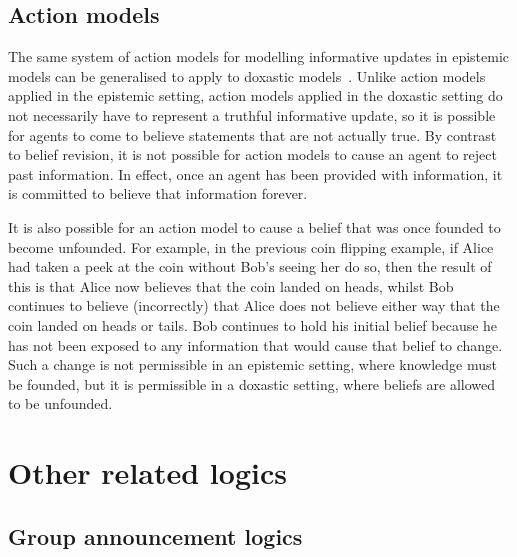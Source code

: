 \subsection{Action models}\label{litreview-am-kd45}

The same system of action models for modelling informative updates in epistemic
models can be generalised to apply to doxastic
models~\cite{vanditmarsch2007dynamic}. Unlike action models applied in the
epistemic setting, action models applied in the doxastic setting do not
necessarily have to represent a truthful informative update, so it is possible
for agents to come to believe statements that are not actually true. By contrast
to belief revision, it is not possible for action models to cause an agent to
reject past information. In effect, once an agent has been provided with
information, it is committed to believe that information forever. 

It is also possible for an action model to cause a belief that was once founded
to become unfounded. For example, in the previous coin flipping example, if
Alice had taken a peek at the coin without Bob's seeing her do so, then the
result of this is that Alice now believes that the coin landed on heads, whilst
Bob continues to believe (incorrectly) that Alice does not believe either way
that the coin landed on heads or tails. Bob continues to hold his initial belief
because he has not been exposed to any information that would cause that belief
to change. Such a change is not permissible in an epistemic setting, where
knowledge must be founded, but it is permissible in a doxastic setting, where
beliefs are allowed to be unfounded.

\section{Other related logics}

\subsection{Group announcement logics}


